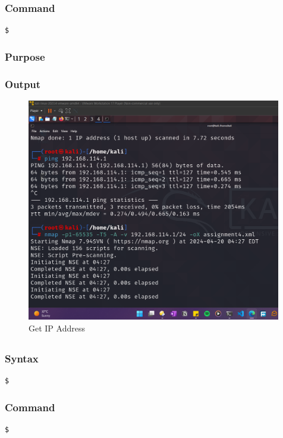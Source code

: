 \documentclass[11pt]{article}
\begin{document}
\subsubsection*{Command}
\begin{verbatim}
$
\end{verbatim}

\subsubsection*{Purpose}

\subsubsection*{Output}
\begin{figure}[H]
    \centering
    \includegraphics[width=0.99\textwidth]{a4 (1).png}
    \caption{Get IP Address}
    \label{fig:1}
\end{figure}
\subsection{}

\subsubsection*{Syntax}
\begin{verbatim}
$
\end{verbatim}

\subsubsection*{Command}
\begin{verbatim}
$
\end{verbatim}
\end{document}
